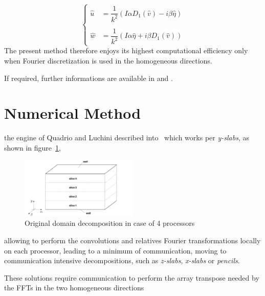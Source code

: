 \begin{equation}
\begin{cases}
\label{uw:eq}
\hat{u} &= \dfrac{1}{k^{2}} ( I \alpha D_{1}(\hat{v} ) - i \beta \hat{\eta})\\\\
\hat{w} &= \dfrac{1}{k^{2}} (I \alpha \hat{\eta} + i \beta D_{1}(\hat{v}))
\end{cases}
\end{equation}
The present method therefore enjoys its highest computational efficiency only when Fourier discretization is used in the homogeneous directions.



If required, further informations are available in \cite[3-7]{ns:quadrio} and \cite{cpl:presentazione}.







\section{Numerical Method}
the engine of Quadrio and Luchini described into~\cite{cpl:presentazione} which works per \emph{y-slabs}, as shown in figure~\ref{domain_decomp},
\begin{figure}
\centering
\includegraphics[width=0.5\textwidth]{grafici/decomp_dominio_cpl}
\caption{Original domain decomposition in case of 4 processors}
\label{domain_decomp}
\end{figure} allowing to perform the convolutions and relatives Fourier transformations locally on each processor, leading to a minimum of communication, moving to communication intensive decompositions, such as \emph{z-slabs}, \emph{x-slabs} or \emph{pencils}.

These solutions require communication to perform the array transpose needed by the FFTs in the two homogeneous directions